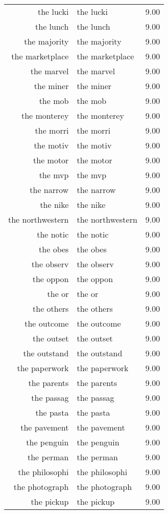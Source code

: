 \begin{table}[ht]
\begin{tabular}{rlr}
  the lucki & the lucki & 9.00 \\ 
  the lunch & the lunch & 9.00 \\ 
  the majority & the majority & 9.00 \\ 
  the marketplace & the marketplace & 9.00 \\ 
  the marvel & the marvel & 9.00 \\ 
  the miner & the miner & 9.00 \\ 
  the mob & the mob & 9.00 \\ 
  the monterey & the monterey & 9.00 \\ 
  the morri & the morri & 9.00 \\ 
  the motiv & the motiv & 9.00 \\ 
  the motor & the motor & 9.00 \\ 
  the mvp & the mvp & 9.00 \\ 
  the narrow & the narrow & 9.00 \\ 
  the nike & the nike & 9.00 \\ 
  the northwestern & the northwestern & 9.00 \\ 
  the notic & the notic & 9.00 \\ 
  the obes & the obes & 9.00 \\ 
  the observ & the observ & 9.00 \\ 
  the oppon & the oppon & 9.00 \\ 
  the or & the or & 9.00 \\ 
  the others & the others & 9.00 \\ 
  the outcome & the outcome & 9.00 \\ 
  the outset & the outset & 9.00 \\ 
  the outstand & the outstand & 9.00 \\ 
  the paperwork & the paperwork & 9.00 \\ 
  the parents & the parents & 9.00 \\ 
  the passag & the passag & 9.00 \\ 
  the pasta & the pasta & 9.00 \\ 
  the pavement & the pavement & 9.00 \\ 
  the penguin & the penguin & 9.00 \\ 
  the perman & the perman & 9.00 \\ 
  the philosophi & the philosophi & 9.00 \\ 
  the photograph & the photograph & 9.00 \\ 
  the pickup & the pickup & 9.00 \\ 

\end{tabular}
\end{table}
